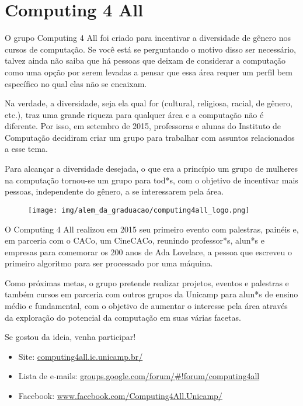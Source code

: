 
\section{Computing 4 All}

O grupo Computing 4 All foi criado para incentivar a diversidade de gênero nos
cursos de computação. Se você está se perguntando o motivo disso ser necessário,
talvez ainda não saiba que há pessoas que deixam de considerar a computação como
uma opção por serem levadas a pensar que essa área requer um perfil bem
específico no qual elas não se encaixam.

Na verdade, a diversidade, seja ela qual for (cultural, religiosa, racial, de
gênero, etc.), traz uma grande riqueza para qualquer área e a computação não é
diferente. Por isso, em setembro de 2015, professoras e alunas do Instituto de
Computação decidiram criar um grupo para trabalhar com assuntos relacionados a
esse tema.

Para alcançar a diversidade desejada, o que era a princípio um grupo de mulheres
na computação tornou-se um grupo para tod*s, com o objetivo de incentivar mais
pessoas, independente do gênero, a se interessarem pela área.

\begin{figure}[H]
    \centering
    \texttt{[image: img/alem\_da\_graduacao/computing4all\_logo.png]}
\end{figure}

O Computing 4 All realizou em 2015 seu primeiro evento com palestras, painéis e,
em parceria com o CACo, um CineCACo, reunindo professor*s, alun*s e empresas
para comemorar os 200 anos de Ada Lovelace, a pessoa que escreveu o primeiro
algoritmo para ser processado por uma máquina.

Como próximas metas, o grupo pretende realizar projetos, eventos e palestras e
também cursos em parceria com outros grupos da Unicamp para alun*s de ensino
médio e fundamental, com o objetivo de aumentar o interesse pela área através da
exploração do potencial da computação em suas várias facetas.

Se gostou da ideia, venha participar!

\begin{itemize}
    \sloppy
	\item Site: \url{computing4all.ic.unicamp.br/}
	\item Lista de e-mails:
          \url{groups.google.com/forum/\#!forum/computing4all}
	\item Facebook: \url{www.facebook.com/Computing4All.Unicamp/}
\end{itemize}